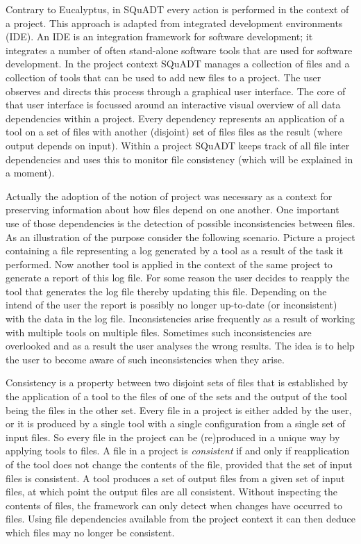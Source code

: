 \documentclass{article}
\newcommand{\squadt}{SQuADT\xspace}
\begin{document}
  
  Contrary to Eucalyptus, in \squadt every action is performed in the context
  of a project. This approach is adapted from integrated development
  environments (IDE).  An IDE is an integration framework for software
  development; it integrates a number of often stand-alone software tools that
  are used for software development. In the project context \squadt manages a
  collection of files and a collection of tools that can be used to add new
  files to a project. The user observes and directs this process through a
  graphical user interface.  The core of that user interface is focussed around
  an interactive visual overview of all data dependencies within a project.
  Every dependency represents an application of a tool on a set of files with
  another (disjoint) set of files files as the result (where output depends on
  input).  Within a project \squadt keeps track of all file inter dependencies
  and uses this to monitor file consistency (which will be explained in a moment).

  Actually the adoption of the notion of project was necessary as a context for
  preserving information about how files depend on one another. One important
  use of those dependencies is the detection of possible inconsistencies
  between files. As an illustration of the purpose consider the following
  scenario. Picture a project containing a file representing a log generated by
  a tool as a result of the task it performed. Now another tool is applied in
  the context of the same project to generate a report of this log file. For
  some reason the user decides to reapply the tool that generates the log file
  thereby updating this file.  Depending on the intend of the user the report
  is possibly no longer up-to-date (or inconsistent) with the data in the log
  file. Inconsistencies arise frequently as a result of working with multiple
  tools on multiple files. Sometimes such inconsistencies are overlooked and as
  a result the user analyses the wrong results. The idea is to help the user
  to become aware of such inconsistencies when they arise.

  Consistency is a property between two disjoint sets of files that is
  established by the application of a tool to the files of one of the sets and
  the output of the tool being the files in the other set.  Every file in a
  project is either added by the user, or it is produced by a single tool with
  a single configuration from a single set of input files. So every file in the
  project can be (re)produced in a unique way by applying tools to files. A
  file in a project is \textit{consistent} if and only if reapplication of the
  tool does not change the contents of the file, provided that the set of input
  files is consistent.  A tool produces a set of output files from a given set
  of input files, at which point the output files are all consistent. Without
  inspecting the contents of files, the framework can only detect when changes
  have occurred to files.  Using file dependencies available from the project
  context it can then deduce which files may no longer be consistent.
  
\end{document}
